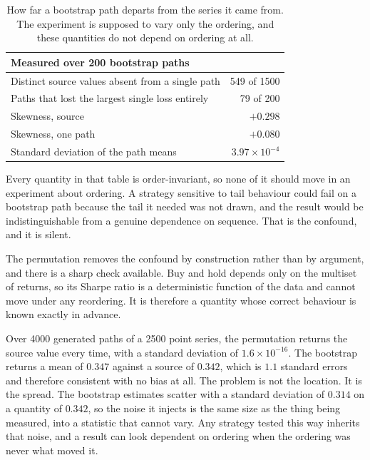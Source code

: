 \documentclass[11pt]{article}
\begin{document}
\begin{table}[h]
  \centering
  \small
  \begin{tabular}{lr}
    \toprule
    Measured over 200 bootstrap paths & \\
    \midrule
    Distinct source values absent from a single path & 549 of 1500 \\
    Paths that lost the largest single loss entirely & 79 of 200 \\
    Skewness, source & $+0.298$ \\
    Skewness, one path & $+0.080$ \\
    Standard deviation of the path means & $3.97\times10^{-4}$ \\
    \bottomrule
  \end{tabular}
  \caption{How far a bootstrap path departs from the series it came from. The
  experiment is supposed to vary only the ordering, and these quantities do not
  depend on ordering at all.}
  \label{tab:bootstrap}
\end{table}

Every quantity in that table is order-invariant, so none of it should move in an
experiment about ordering. A strategy sensitive to tail behaviour could fail on
a bootstrap path because the tail it needed was not drawn, and the result would
be indistinguishable from a genuine dependence on sequence. That is the
confound, and it is silent.

The permutation removes the confound by construction rather than by argument, and
there is a sharp check available. Buy and hold depends only on the multiset of
returns, so its Sharpe ratio is a deterministic function of the data and cannot
move under any reordering. It is therefore a quantity whose correct behaviour is
known exactly in advance.

Over 4000 generated paths of a 2500 point series, the permutation returns the
source value every time, with a standard deviation of $1.6\times10^{-16}$. The
bootstrap returns a mean of $0.347$ against a source of $0.342$, which is $1.1$
standard errors and therefore consistent with no bias at all. The problem is not
the location. It is the spread. The bootstrap estimates scatter with a standard
deviation of $0.314$ on a quantity of $0.342$, so the noise it injects is the
same size as the thing being measured, into a statistic that cannot vary. Any
strategy tested this way inherits that noise, and a result can look dependent on
ordering when the ordering was never what moved it.
\end{document}
